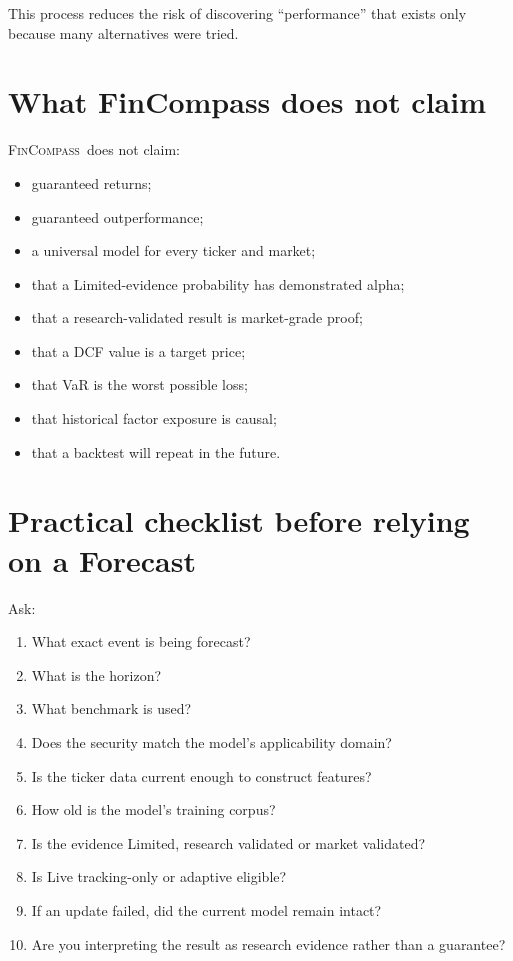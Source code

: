 \documentclass[11pt]{article}
\newcommand{\FC}{\textsc{FinCompass}}
\begin{document}
This process reduces the risk of discovering ``performance'' that exists only because many alternatives were tried.

\section{What FinCompass does not claim}
\FC\ does not claim:
\begin{itemize}[itemsep=0.15em]
\item guaranteed returns;
\item guaranteed outperformance;
\item a universal model for every ticker and market;
\item that a Limited-evidence probability has demonstrated alpha;
\item that a research-validated result is market-grade proof;
\item that a DCF value is a target price;
\item that VaR is the worst possible loss;
\item that historical factor exposure is causal;
\item that a backtest will repeat in the future.
\end{itemize}

\section{Practical checklist before relying on a Forecast}
Ask:
\begin{enumerate}[itemsep=0.2em]
\item What exact event is being forecast?
\item What is the horizon?
\item What benchmark is used?
\item Does the security match the model's applicability domain?
\item Is the ticker data current enough to construct features?
\item How old is the model's training corpus?
\item Is the evidence Limited, research validated or market validated?
\item Is Live tracking-only or adaptive eligible?
\item If an update failed, did the current model remain intact?
\item Are you interpreting the result as research evidence rather than a guarantee?
\end{enumerate}
\end{document}
